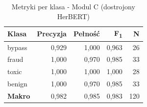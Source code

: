 
\begin{table}[H]
\centering
\caption{Metryki per klasa - Modul C (dostrojony HerBERT)}
\label{tab:herbert-metrics}
\renewcommand{\arraystretch}{1.2}
\begin{tabular}{lrrrr}
\hline
\textbf{Klasa} & \textbf{Precyzja} & \textbf{Pełność} & \textbf{F\textsubscript{1}} & \textbf{N} \\
\hline
bypass & 0{,}929 & 1{,}000 & 0{,}963 & 26 \\
fraud & 1{,}000 & 0{,}970 & 0{,}985 & 33 \\
toxic & 1{,}000 & 1{,}000 & 1{,}000 & 28 \\
benign & 1{,}000 & 0{,}970 & 0{,}985 & 33 \\
\hline
\textbf{Makro} & 0{,}982 & 0{,}985 & 0{,}983 & 120 \\
\hline
\end{tabular}
\end{table}
